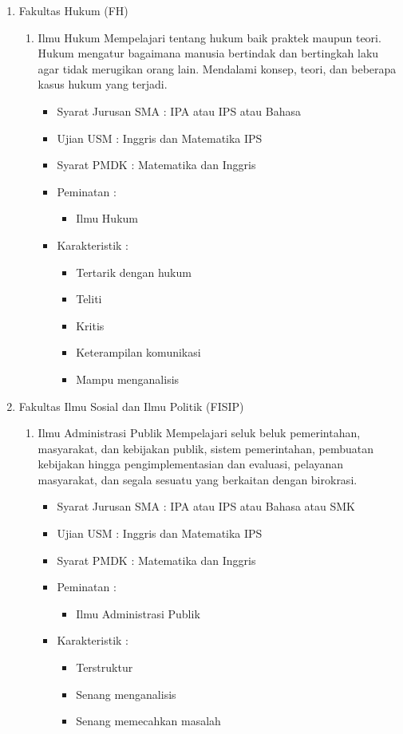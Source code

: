 \documentclass[a4paper,twoside]{article}
\begin{document}
\begin{enumerate}
\begin{enumerate}
			\item Fakultas Hukum (FH)
			\begin{enumerate}
				\item Ilmu Hukum
					Mempelajari tentang hukum baik praktek maupun teori. Hukum mengatur bagaimana manusia bertindak dan bertingkah laku agar tidak merugikan orang lain. Mendalami konsep, teori, dan beberapa kasus hukum yang terjadi.
					\begin{itemize}
						\item Syarat Jurusan SMA : IPA atau IPS atau Bahasa
						\item Ujian USM : Inggris dan Matematika IPS
						\item Syarat PMDK : Matematika dan Inggris
						\item Peminatan :
						\begin{itemize}
							\item Ilmu Hukum
						\end{itemize}
						\item Karakteristik :
						\begin{itemize}
							\item Tertarik dengan hukum
							\item Teliti
							\item Kritis
							\item Keterampilan komunikasi
							\item Mampu menganalisis
						\end{itemize}
					\end{itemize}
			\end{enumerate}
			
			\item Fakultas Ilmu Sosial dan Ilmu Politik (FISIP)
			\begin{enumerate}
				\item Ilmu Administrasi Publik
					Mempelajari seluk beluk pemerintahan, masyarakat, dan kebijakan publik, sistem pemerintahan, pembuatan kebijakan hingga pengimplementasian dan evaluasi, pelayanan masyarakat, dan segala sesuatu yang berkaitan dengan birokrasi.
					\begin{itemize}
						\item Syarat Jurusan SMA : IPA atau IPS atau Bahasa atau SMK
						\item Ujian USM : Inggris dan Matematika IPS
						\item Syarat PMDK : Matematika dan Inggris
						\item Peminatan :
						\begin{itemize}
							\item Ilmu Administrasi Publik
						\end{itemize}
						\item Karakteristik :
						\begin{itemize}
							\item Terstruktur
							\item Senang menganalisis
							\item Senang memecahkan masalah
						\end{itemize}
					\end{itemize}
					

\end{enumerate}
\end{enumerate}
\end{enumerate}
\end{document}
